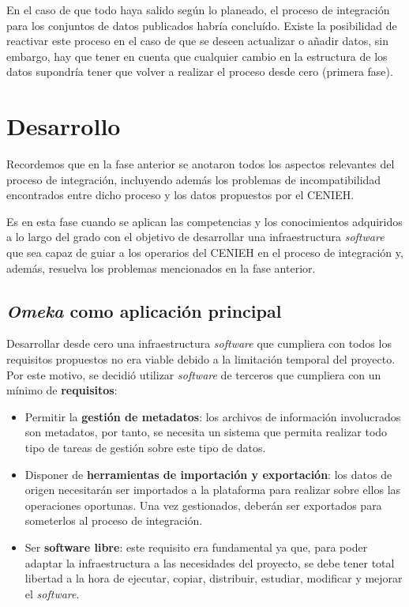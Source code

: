 En el caso de que todo haya salido según lo planeado, el proceso de
integración para los conjuntos de datos publicados habría concluído.
Existe la posibilidad de reactivar este proceso en el caso de que se
deseen actualizar o añadir datos, sin embargo, hay que tener en cuenta
que cualquier cambio en la estructura de los datos supondría tener que
volver a realizar el proceso desde cero (primera fase).

\section{Desarrollo}

Recordemos que en la fase anterior se anotaron todos los aspectos
relevantes del proceso de integración, incluyendo además los problemas
de incompatibilidad encontrados entre dicho proceso y los datos
propuestos por el CENIEH. 

Es en esta fase cuando se aplican las competencias y los conocimientos 
adquiridos a lo largo del grado con el objetivo de desarrollar una infraestructura 
\emph{software} que sea capaz de guiar a los operarios del CENIEH en el proceso de integración
y, además, resuelva los problemas mencionados en la fase anterior.

\subsection{\emph{Omeka} como aplicación principal}

Desarrollar desde cero una infraestructura \emph{software} que cumpliera
con todos los requisitos propuestos no era viable debido a la limitación
temporal del proyecto. Por este motivo, se decidió utilizar
\emph{software} de terceros que cumpliera con un mínimo de
\textbf{requisitos}:

\begin{itemize}
\tightlist
\item
  Permitir la \textbf{gestión de metadatos}: los archivos de información
  involucrados son metadatos, por tanto, se necesita un sistema que
  permita realizar todo tipo de tareas de gestión sobre este tipo de
  datos.
\item
  Disponer de \textbf{herramientas de importación y exportación}: los
  datos de origen necesitarán ser importados a la plataforma para
  realizar sobre ellos las operaciones oportunas. Una vez gestionados,
  deberán ser exportados para someterlos al proceso de integración.
\item
  Ser \textbf{software libre}: este requisito era fundamental ya que,
  para poder adaptar la infraestructura a las necesidades del proyecto,
  se debe tener total libertad a la hora de ejecutar, copiar,
  distribuir, estudiar, modificar y mejorar el \emph{software}.
\end{itemize}

